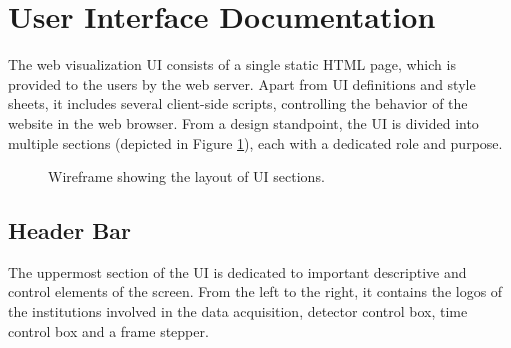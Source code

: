 \section{User Interface Documentation}
The web visualization UI consists of a single static HTML page, which is provided to the users by the web server. Apart from UI definitions and style sheets, it includes several client-side scripts, controlling the behavior of the website in the web browser. From a design standpoint, the UI is divided into multiple sections (depicted in Figure \ref{fig:wireframe}), each with a dedicated role and purpose.

\begin{figure}[t]
\begin{center}

	\todo %

\caption{Wireframe showing the layout of UI sections.}
\label{fig:wireframe}
\end{center}
\end{figure}

\subsection{Header Bar}
The uppermost section of the UI is dedicated to important descriptive and control elements of the screen. From the left to the right, it contains the logos of the institutions involved in the data acquisition, detector control box, time control box and a frame stepper.

